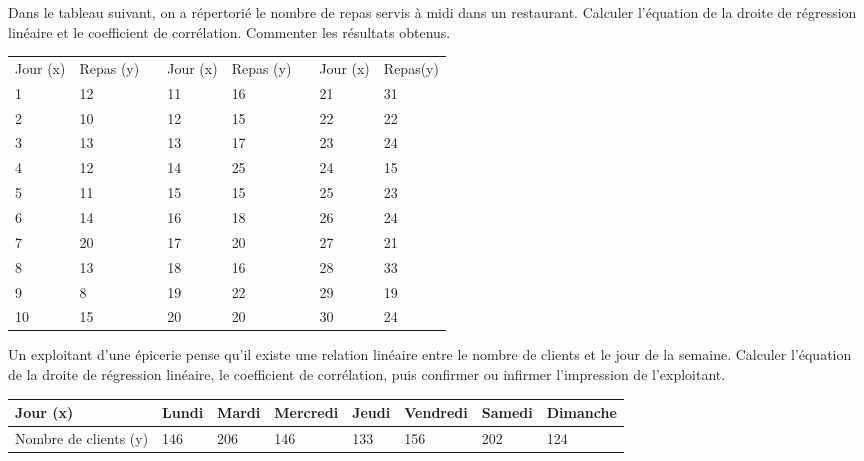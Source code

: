 \begin{exercice}
Dans le tableau suivant, on a répertorié le nombre de repas servis à midi dans un restaurant. Calculer l'équation de la droite de régression linéaire et le coefficient de corrélation. Commenter les résultats obtenus.

\begin{tabular}{|l|l|l|l|l|l|l|l|}
\cline{1-2} \cline{4-5} \cline{7-8}
Jour (x) & Repas (y) &  & Jour (x) & Repas (y) &  & Jour (x) & Repas(y) \\ \cline{1-2} \cline{4-5} \cline{7-8} 
1        & 12        &  & 11       & 16        &  & 21       & 31       \\ \cline{1-2} \cline{4-5} \cline{7-8} 
2        & 10        &  & 12       & 15        &  & 22       & 22       \\ \cline{1-2} \cline{4-5} \cline{7-8} 
3        & 13        &  & 13       & 17        &  & 23       & 24       \\ \cline{1-2} \cline{4-5} \cline{7-8} 
4        & 12        &  & 14       & 25        &  & 24       & 15       \\ \cline{1-2} \cline{4-5} \cline{7-8} 
5        & 11        &  & 15       & 15        &  & 25       & 23       \\ \cline{1-2} \cline{4-5} \cline{7-8} 
6        & 14        &  & 16       & 18        &  & 26       & 24       \\ \cline{1-2} \cline{4-5} \cline{7-8} 
7        & 20        &  & 17       & 20        &  & 27       & 21       \\ \cline{1-2} \cline{4-5} \cline{7-8} 
8        & 13        &  & 18       & 16        &  & 28       & 33       \\ \cline{1-2} \cline{4-5} \cline{7-8} 
9        & 8         &  & 19       & 22        &  & 29       & 19       \\ \cline{1-2} \cline{4-5} \cline{7-8} 
10       & 15        &  & 20       & 20        &  & 30       & 24       \\ \cline{1-2} \cline{4-5} \cline{7-8} 
\end{tabular}
\end{exercice}

\begin{exercice}
Un exploitant d'une épicerie pense qu'il existe une relation linéaire entre le nombre de clients et le jour de la semaine. Calculer l'équation de la droite de régression linéaire, le coefficient de corrélation, puis confirmer ou infirmer l'impression de l'exploitant.

\begin{tabular}{|l|l|l|l|l|l|l|l|}
\hline
Jour (x)              & Lundi & Mardi & Mercredi & Jeudi & Vendredi & Samedi & Dimanche \\ \hline
Nombre de clients (y) & 146   & 206   & 146      & 133   & 156      & 202    & 124      \\ \hline
\end{tabular}
\end{exercice}


